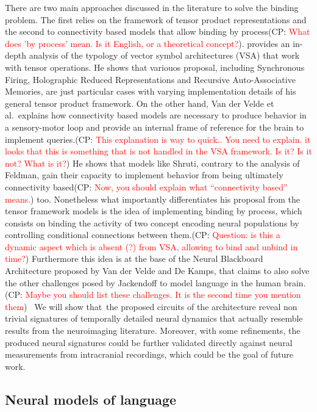 \documentclass[10pt]{article}
\newcommand{\noteCP}[1]{(CP: \textcolor{red}{#1})}
\begin{document}
There are two main approaches discussed in the literature to solve the
binding problem. The first relies on the framework of tensor product
representations and the second to connectivity based models that allow
binding by process\noteCP{What does 'by process' mean. Is it English, or a theoretical concept?}. \cite{smolensky2006harmonic} provides an in-depth analysis of the
typology of vector symbol architectures (VSA) that work with tensor
operations. He shows that variouos proposal, including Synchronous Firing\cite{Shastri_1993},
Holographic Reduced Representations\cite{Plate_1995} and Recursive
Auto-Associative Memories\cite{Chalmers_1992}, are just particular cases
with varying implementation details of his general tensor product
framework. On the other hand, Van der Velde et
al.\cite{van_der_Velde_2015}~explains how connectivity based models are
necessary to produce behavior in a sensory-motor loop and provide an
internal frame of reference for the brain to implement queries.\noteCP{This explanation is way to quick.. You need to explain. it looks that this is something that is not handled in the VSA framework. Is it? Is it not? What is it?} He shows
that models like Shruti\cite{Shastri_1993}, contrary to the analysis of
Feldman\cite{Feldman_2012}, gain their capacity to implement behavior
from being ultimately connectivity based\noteCP{Now, you should explain what ``connectivity based'' means.} too. Nonetheless what
importantly differentiates his proposal from the tensor framework models
is the idea of implementing binding by process, which consists on
binding the activity of two concept encoding neural populations by
controlling conditional connections between them.\noteCP{Question: is this  a dynamic aspect which is absent (?) from VSA, allowing to bind and unbind in time?} Furthermore this idea
is at the base of the Neural Blackboard Architecture proposed by Van der
Velde and De Kamps\cite{van_der_Velde_2006}, that claims to also solve the
other challenges posed by Jackendoff to model language in the human
brain.\noteCP{Maybe you should list these challenges. It is the second time you mention them}  We will show that~the proposed circuits of the architecture
reveal non trivial signatures of temporally detailed neural dynamics
that actually resemble results from the neuroimaging literature.
Moreover, with some refinements, the produced neural signatures could be
further validated directly against neural measurements from intracranial
recordings, which could be the goal of future work.

\subsection{Neural models of language}
\end{document}
